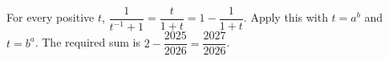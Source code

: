 For every positive $t$, $\dfrac{1}{t^{-1}+1}=\dfrac{t}{1+t}=1-\dfrac{1}{1+t}$. Apply this with $t=a^b$ and $t=b^a$. The required sum is $2-\dfrac{2025}{2026}=\boxed{\dfrac{2027}{2026}}$.
